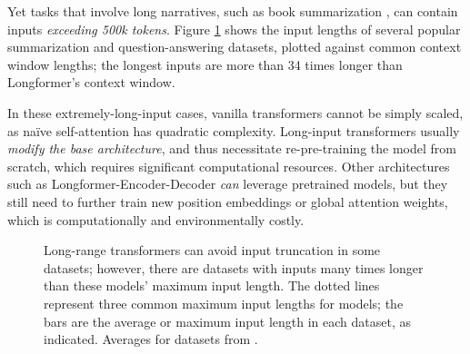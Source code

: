 \documentclass{article}
\begin{document}
Yet tasks that involve long narratives, such as book summarization \citep{booksum},
can contain inputs \emph{exceeding 500k tokens}. %
Figure \ref{fig:dataset-size} shows the input lengths of several popular summarization and question-answering datasets, plotted against common context window lengths; the longest inputs are more than 34 times longer than Longformer's context window.

In these extremely-long-input cases, vanilla transformers cannot be simply scaled, as na\"ive self-attention has quadratic complexity. 
Long-input transformers 
usually \emph{modify the base architecture}, 
and thus
necessitate re-pre-training the model from scratch, which 
requires significant computational resources.
Other architectures such as Longformer-Encoder-Decoder \citep[LED; ][]{beltagy2020longformer} \emph{can} leverage pretrained models, but they still need to further train new position embeddings or global attention weights,
which is computationally and environmentally costly. 


\begin{figure}
    \centering {}
    \caption{Long-range transformers can avoid input truncation in some datasets; however, there are datasets with inputs many times longer than these models' maximum input length. The dotted lines represent three common maximum input lengths for models; the bars are the average or maximum input length in each dataset, as indicated. Averages for datasets from \citet{empirical-longdoc-summary}.
    }
    \label{fig:dataset-size}
\vspace{-2mm}
\end{figure}
\end{document}
